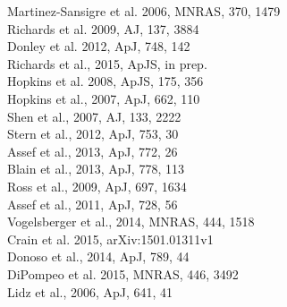\documentclass[oneside, a4paper, onecolumn, 11pt]{article}
\begin{document}
\begin{multicols}{3}[]
\rbrack Martinez-Sansigre et al. 2006, MNRAS, 370, 1479\\
\rbrack Richards et al. 2009, AJ, 137, 3884  \\
\rbrack Donley et al. 2012, ApJ, 748, 142\\
\rbrack Richards et al., 2015, ApJS, in prep.\\
\rbrack Hopkins et al. 2008, ApJS, 175, 356\\
\rbrack Hopkins et al., 2007, ApJ, 662, 110 \\
\rbrack Shen et al., 2007, AJ, 133, 2222 \\
\rbrack Stern et al., 2012, ApJ, 753, 30\\
\rbrack Assef et al., 2013, ApJ, 772, 26\\
\rbrack Blain et al., 2013, ApJ, 778, 113\\
\rbrack Ross et al., 2009, ApJ, 697, 1634 \\
\rbrack Assef  et al., 2011, ApJ, 728, 56\\
\rbrack Vogelsberger et al., 2014, MNRAS, 444, 1518\\
\rbrack Crain et al. 2015, arXiv:1501.01311v1\\
\rbrack Donoso et al., 2014, ApJ, 789, 44\\
\rbrack DiPompeo et al. 2015, MNRAS, 446, 3492\\
\rbrack Lidz et al., 2006, ApJ, 641, 41 \\




\end{multicols}
\end{document}
